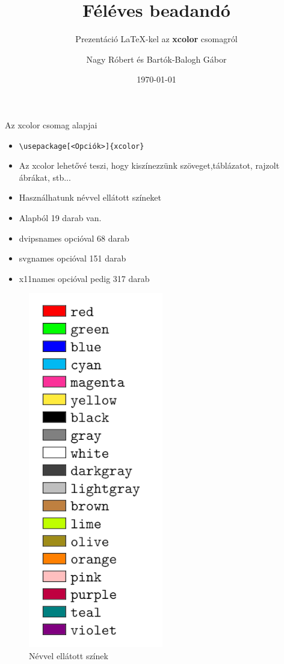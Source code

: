 \documentclass[aspectratio=1610, dvipsnames, xcolor=table]{beamer}
\title{Féléves beadandó}
\author{Nagy Róbert és Bartók-Balogh Gábor}
\date{\today}
\subtitle{Prezentáció  \LaTeX-kel az \textbf{xcolor} csomagról}
\institute{Miskolci Egyetem}
\begin{document}
    \frame[plain]{\maketitle}

        
    \begin{frame}[fragile]{Az xcolor csomag alapjai}
        \begin{minipage}{0.6\textwidth}
            \begin{itemize}
            \item {}\verb!\usepackage[<Opciók>]{xcolor}!
            \item {}Az xcolor lehetővé teszi, hogy kiszínezzünk szöveget,táblázatot, rajzolt ábrákat, stb... 
            \item {}Használhatunk névvel ellátott színeket
            \item {}Alapból 19 darab van.
            \item {}dvipsnames opcióval 68 darab
            \item {}svgnames opcióval 151 darab 
            \item {}x11names opcióval pedig 317 darab
            \end{itemize}
        \end{minipage} \hfill
        \begin{minipage}{0.35\textwidth}    
            \begin{figure}
                \includegraphics[scale=0.4]{img/szinek.png}
                \caption{Névvel ellátott színek}
            \end{figure}
        \end{minipage}
    \end{frame}
\end{document}
